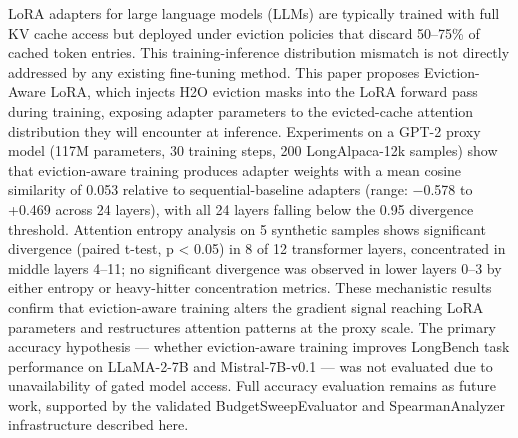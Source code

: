 
LoRA adapters for large language models (LLMs) are typically trained with full KV cache access but deployed under eviction policies that discard 50–75\% of cached token entries. This training-inference distribution mismatch is not directly addressed by any existing fine-tuning method. This paper proposes Eviction-Aware LoRA, which injects H2O eviction masks into the LoRA forward pass during training, exposing adapter parameters to the evicted-cache attention distribution they will encounter at inference. Experiments on a GPT-2 proxy model (117M parameters, 30 training steps, 200 LongAlpaca-12k samples) show that eviction-aware training produces adapter weights with a mean cosine similarity of 0.053 relative to sequential-baseline adapters (range: −0.578 to +0.469 across 24 layers), with all 24 layers falling below the 0.95 divergence threshold. Attention entropy analysis on 5 synthetic samples shows significant divergence (paired t-test, p < 0.05) in 8 of 12 transformer layers, concentrated in middle layers 4–11; no significant divergence was observed in lower layers 0–3 by either entropy or heavy-hitter concentration metrics. These mechanistic results confirm that eviction-aware training alters the gradient signal reaching LoRA parameters and restructures attention patterns at the proxy scale. The primary accuracy hypothesis — whether eviction-aware training improves LongBench task performance on LLaMA-2-7B and Mistral-7B-v0.1 — was not evaluated due to unavailability of gated model access. Full accuracy evaluation remains as future work, supported by the validated BudgetSweepEvaluator and SpearmanAnalyzer infrastructure described here.

